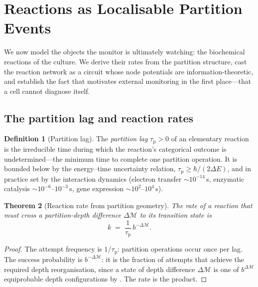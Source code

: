 \documentclass[11pt,twocolumn,a4paper]{article}
\theoremstyle{thmstyle}
\newtheorem{theorem}{Theorem}[section]
\theoremstyle{definition}
\newtheorem{definition}[theorem]{Definition}
\theoremstyle{remark}
\newcommand{\Depth}{\mathcal{M}}
\newcommand{\taup}{\tau_{\mathrm{p}}}
\begin{document}
\section{Reactions as Localisable Partition Events}
\label{sec:reactions}

We now model the objects the monitor is ultimately watching: the
biochemical reactions of the culture. We derive their rates from the
partition structure, cast the reaction network as a circuit whose node
potentials are information-theoretic, and establish the fact that motivates
external monitoring in the first place---that a cell cannot diagnose itself.

\subsection{The partition lag and reaction rates}

\begin{definition}[Partition lag]
\label{def:lag}
The \emph{partition lag} $\taup>0$ of an elementary reaction is the
irreducible time during which the reaction's categorical outcome is
undetermined---the minimum time to complete one partition operation. It is
bounded below by the energy--time uncertainty relation,
$\taup\ge\hbar/(2\Delta E)$, and in practice set by the interaction
dynamics (electron transfer $\sim10^{-14}\,$s, enzymatic catalysis
$\sim10^{-6}$--$10^{-3}\,$s, gene expression $\sim10^{2}$--$10^{4}\,$s).
\end{definition}

\begin{theorem}[Reaction rate from partition geometry]
\label{thm:rate}
The rate of a reaction that must cross a partition-depth difference
$\Delta\Depth$ to its transition state is
\[
k\;=\;\frac{1}{\taup}\,b^{-\Delta\Depth}.
\]
\end{theorem}

\begin{proof}
The attempt frequency is $1/\taup$: partition operations occur once per
lag. The success probability is $b^{-\Delta\Depth}$: it is the fraction of
attempts that achieve the required depth reorganisation, since a state of
depth difference $\Delta\Depth$ is one of $b^{\Delta\Depth}$ equiprobable
depth configurations by . The rate is the product.
\end{proof}
\end{document}
